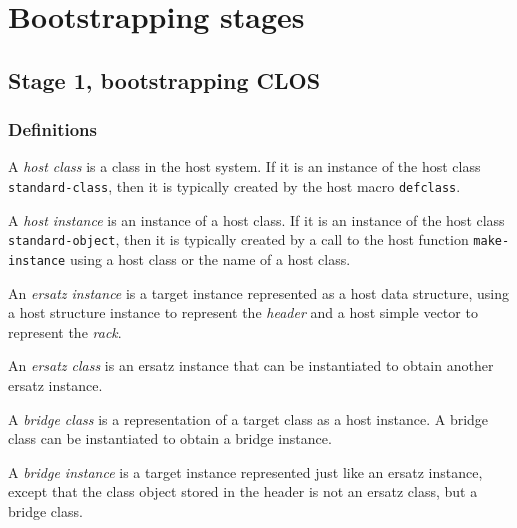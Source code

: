 \section{Bootstrapping stages}

\subsection{Stage 1, bootstrapping CLOS}

\subsubsection{Definitions}

\begin{definition}
A \emph{host class} is a class in the host system.  If it is an
instance of the host class \texttt{standard-class}, then it is
typically created by the host macro \texttt{defclass}.
\end{definition}

\begin{definition}
A \emph{host instance} is an instance of a host class.  If it is an
instance of the host class \texttt{standard-object}, then it is
typically created by a call to the host function
\texttt{make-instance} using a host class or the name of a host class.
\end{definition}

\begin{definition}
An \emph{ersatz instance} is a target instance represented as a host
data structure, using a host structure instance to represent the
\emph{header} and a host simple vector to represent the \emph{rack}.
\end{definition}

\begin{definition}
An \emph{ersatz class} is an ersatz instance that can be instantiated
to obtain another ersatz instance.
\end{definition}

\begin{definition}
A \emph{bridge class} is a representation of a target class as a host
instance.  A bridge class can be instantiated to obtain a bridge
instance. 
\end{definition}

\begin{definition}
A \emph{bridge instance} is a target instance represented just like an
ersatz instance, except that the class object stored in the header is
not an ersatz class, but a bridge class. 
\end{definition}

